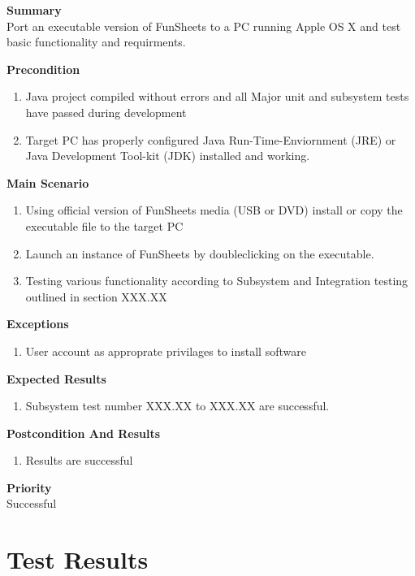 \documentclass[12pt]{article}
\begin{document}
\noindent
{\bf Summary}\\
Port an executable version of FunSheets to a PC running Apple OS X and test basic functionality and requirments.

\noindent
{\bf Precondition}\\
\begin{enumerate}
\item Java project compiled without errors and all Major unit and subsystem tests have passed during development
\item Target PC has properly configured Java Run-Time-Enviornment (JRE) or Java Development Tool-kit (JDK) installed and working.
\end{enumerate}

\noindent
{\bf Main Scenario}\
\vspace*{-0.2in}
\begin{enumerate}
\item Using official version of FunSheets media (USB or DVD) install or copy the executable file to the target PC
\item Launch an instance of FunSheets by doubleclicking on the executable.
\item Testing various functionality according to Subsystem and Integration testing outlined in section XXX.XX
\end{enumerate}

{\bf Exceptions}\
\begin{enumerate}
\item User account as approprate privilages to install software
\end{enumerate}

{\bf Expected Results}\
\begin{enumerate}
\item Subsystem test number XXX.XX to XXX.XX are successful.
\end{enumerate}

{\bf Postcondition And Results}\
\begin{enumerate}
\item Results are successful
\end{enumerate}

\noindent
{\bf Priority}\\
Successful
\noindent
\section{Test Results}
\end{document}
